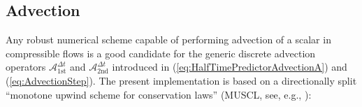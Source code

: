 \documentclass{ametsoc}
\theoremstyle{definition}
\newcommand{\eq}[1]{(\ref{#1})}
\newcommand{\dt}{\Delta t}
\begin{document}

\subsection{Advection}
\label{ssec:Advection}

Any robust numerical scheme capable of performing advection of a scalar in
compressible flows is a good candidate for the generic discrete
advection operators $\mathcal{A}_{\text{1st}}^{\dt}$ and 
$\mathcal{A}_{\text{2nd}}^{\dt}$ introduced in \eq{eq:HalfTimePredictorAdvectionA}
and \eq{eq:AdvectionStep}. 
The present implementation is based on a directionally split 
``monotone upwind scheme for conservation laws'' (MUSCL, see, e.g.,
\citet{vanLeer2006}): 
\end{document}

